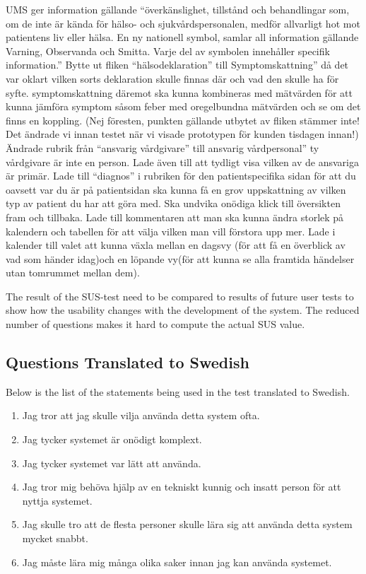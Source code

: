 \documentclass{article}
\begin{document}
	UMS ger information gällande “överkänslighet, tillstånd och behandlingar som, om de inte är kända för hälso- och sjukvårdspersonalen, medför allvarligt hot mot patientens liv eller hälsa. En ny nationell symbol, samlar all information gällande Varning, Observanda och Smitta. Varje del av symbolen innehåller specifik information.”
	Bytte ut fliken “hälsodeklaration” till Symptomskattning” då det var oklart vilken sorts deklaration skulle finnas där och vad den skulle ha för syfte. symptomskattning däremot ska kunna kombineras med mätvärden för att kunna jämföra symptom såsom feber med oregelbundna mätvärden och se om det finns en koppling. 
	(Nej föresten, punkten gällande utbytet av fliken stämmer inte! Det ändrade vi innan testet när vi visade prototypen för kunden tisdagen innan!)
	Ändrade rubrik från “ansvarig vårdgivare” till ansvarig vårdpersonal” ty vårdgivare är inte en person. Lade även till att tydligt visa vilken av de ansvariga är primär. 
	Lade till “diagnos” i rubriken för den patientspecifika sidan för att du oavsett var du är på patientsidan ska kunna få en grov uppskattning av vilken typ av patient du har att göra med. Ska undvika onödiga klick till översikten fram och tillbaka. 
	Lade till kommentaren att man ska kunna ändra storlek på kalendern och tabellen för att välja vilken man vill förstora upp mer. 
	Lade i kalender till valet att kunna växla mellan en dagsvy (för att få en överblick av vad som händer idag)och en löpande vy(för att kunna se alla framtida händelser utan tomrummet mellan dem).
	
	The result of the SUS-test need to be compared to results of future user tests to show how the usability changes with the development of the system. The reduced number of questions makes it hard to compute the actual SUS value.
	
	\clearpage
	\begin{appendices}
		\section{Questions Translated to Swedish}
		Below is the list of the statements being used in the test translated to Swedish. 
		\begin{enumerate}
			\item Jag tror att jag skulle vilja använda detta system ofta.
			\item Jag tycker systemet är onödigt komplext.
			\item Jag tycker systemet var lätt att använda.
			\item Jag tror mig behöva hjälp av en tekniskt kunnig och insatt person för att nyttja systemet. 
			\item Jag skulle tro att de flesta personer skulle lära sig att använda detta system mycket snabbt.
			\item Jag måste lära mig många olika saker innan jag kan använda systemet.
		\end{enumerate}
	\end{appendices}
	
	
\end{document}
